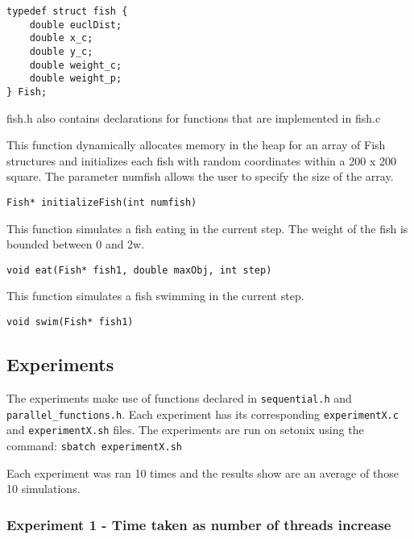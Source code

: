 \documentclass[
]{article}
\begin{document}
\begin{verbatim}
typedef struct fish {
    double euclDist;
    double x_c;
    double y_c;
    double weight_c;
    double weight_p;
} Fish;
\end{verbatim}

fish.h also contains declarations for functions that are implemented in
fish.c

This function dynamically allocates memory in the heap for an array of
Fish structures and initializes each fish with random coordinates within
a 200 x 200 square. The parameter numfish allows the user to specify the
size of the array.

\begin{verbatim}
Fish* initializeFish(int numfish)
\end{verbatim}

This function simulates a fish eating in the current step. The weight of
the fish is bounded between 0 and 2w.

\begin{verbatim}
void eat(Fish* fish1, double maxObj, int step)
\end{verbatim}

This function simulates a fish swimming in the current step.

\begin{verbatim}
void swim(Fish* fish1)
\end{verbatim}

\hypertarget{experiments}{%
\subsection{Experiments}\label{experiments}}

The experiments make use of functions declared in \texttt{sequential.h}
and \texttt{parallel\_functions.h}. Each experiment has its
corresponding \texttt{experimentX.c} and \texttt{experimentX.sh} files.
The experiments are run on setonix using the command:
\texttt{sbatch\ experimentX.sh}

Each experiment was ran 10 times and the results show are an average of
those 10 simulations.

\hypertarget{experiment-1---time-taken-as-number-of-threads-increase}{%
\subsubsection{Experiment 1 - Time taken as number of threads
increase}\label{experiment-1---time-taken-as-number-of-threads-increase}}
\end{document}
